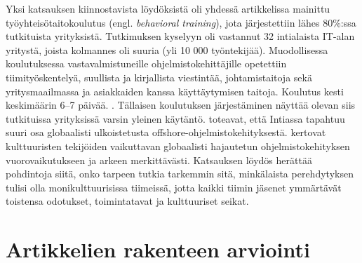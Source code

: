 \documentclass[utf8]{gradu3}
\begin{document}
Yksi katsauksen kiinnostavista löydöksistä oli yhdessä artikkelissa \parencite{kulkarni-ym-2010} mainittu työyhteisötaitokoulutus (engl. \textit{behavioral training}), jota järjestettiin lähes 80\%:ssa tutkituista yrityksistä. Tutkimuksen kyselyyn oli vastannut 32 intialaista IT-alan yritystä, joista kolmannes oli suuria (yli 10 000 työntekijää). Muodollisessa koulutuksessa vastavalmistuneille ohjelmistokehittäjille opetettiin tiimityöskentelyä, suullista ja kirjallista viestintää, johtamistaitoja sekä yritysmaailmassa ja asiakkaiden kanssa käyttäytymisen taitoja. Koulutus kesti keskimäärin 6--7 päivää. \parencite{kulkarni-ym-2010}. Tällaisen koulutuksen järjestäminen näyttää olevan siis tutkituissa yrityksissä varsin yleinen käytäntö. \textcite{kulkarni-ym-2010} toteavat, että Intiassa tapahtuu suuri osa globaalisti ulkoistetusta offshore-ohjelmistokehityksestä. \textcite{olson-olson-2003} kertovat kulttuuristen tekijöiden vaikuttavan globaalisti hajautetun ohjelmistokehityksen vuorovaikutukseen ja arkeen merkittävästi. Katsauksen löydös herättää pohdintoja siitä, onko tarpeen tutkia tarkemmin sitä, minkälaista perehdytyksen tulisi olla monikulttuurisissa tiimeissä, jotta kaikki tiimin jäsenet ymmärtävät toistensa odotukset, toimintatavat ja kulttuuriset seikat.

\section{Artikkelien rakenteen arviointi}
\label{luku-pohdinta-artikkelien-rakenteen-arviointi}
\end{document}
